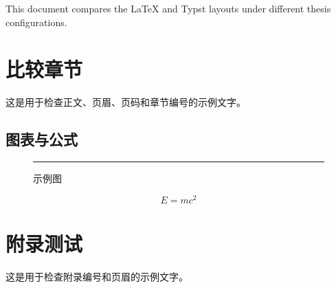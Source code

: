 \documentclass{thuthesis}
\begin{document}
\maketitle

\frontmatter

\begin{abstract}
  本文用于比较 LaTeX 与 Typst 模板在不同论文配置下的版式。
\end{abstract}

\begin{abstract*}
  This document compares the LaTeX and Typst layouts under different thesis configurations.
\end{abstract*}

\tableofcontents

\mainmatter

\chapter{比较章节}

这是用于检查正文、页眉、页码和章节编号的示例文字。

\section{图表与公式}

\begin{figure}[htb]
  \centering
  \rule{3cm}{1cm}
  \caption{示例图}
\end{figure}

\begin{equation}
  E = mc^2
\end{equation}

\appendix

\chapter{附录测试}

这是用于检查附录编号和页眉的示例文字。
\end{document}
